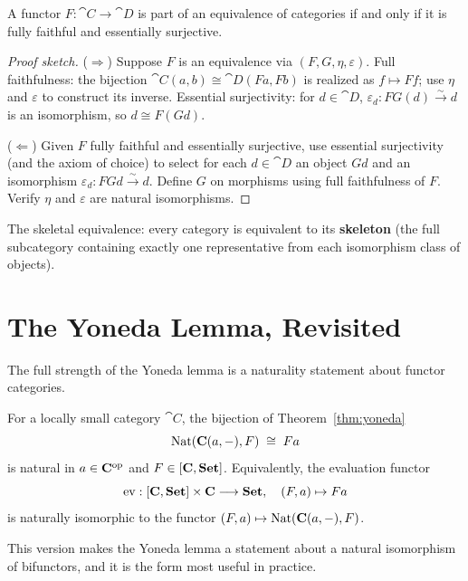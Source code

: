 \begin{theorem}
A functor $F: \cat{C} \to \cat{D}$ is part of an equivalence of categories if and only if it is fully faithful and essentially surjective.
\end{theorem}

\begin{proof}[Proof sketch]
($\Rightarrow$) Suppose $F$ is an equivalence via $(F, G, \eta, \varepsilon)$. Full faithfulness: the bijection $\cat{C}(a,b) \cong \cat{D}(Fa, Fb)$ is realized as $f \mapsto Ff$; use $\eta$ and $\varepsilon$ to construct its inverse. Essential surjectivity: for $d \in \cat{D}$, $\varepsilon_d: FG(d) \xrightarrow{\sim} d$ is an isomorphism, so $d \cong F(Gd)$.

($\Leftarrow$) Given $F$ fully faithful and essentially surjective, use essential surjectivity (and the axiom of choice) to select for each $d \in \cat{D}$ an object $Gd$ and an isomorphism $\varepsilon_d: FGd \xrightarrow{\sim} d$. Define $G$ on morphisms using full faithfulness of $F$. Verify $\eta$ and $\varepsilon$ are natural isomorphisms.
\end{proof}

\begin{example}
The skeletal equivalence: every category is equivalent to its \textbf{skeleton} (the full subcategory containing exactly one representative from each isomorphism class of objects).
\end{example}

\section{The Yoneda Lemma, Revisited}

The full strength of the Yoneda lemma is a naturality statement about functor categories.

\begin{theorem}
For a locally small category $\cat{C}$, the bijection of Theorem~\ref{thm:yoneda}
\[
  \operatorname{Nat}(\mathbf{C}(a,-), F) \;\cong\; Fa
\]
is natural in $a \in \mathbf{C}^{\mathrm{op}}$ and $F \in [\mathbf{C}, \mathbf{Set}]$. Equivalently, the evaluation functor
\[
  \mathrm{ev}: [\mathbf{C}, \mathbf{Set}] \times \mathbf{C} \longrightarrow \mathbf{Set}, \quad (F, a) \mapsto Fa
\]
is naturally isomorphic to the functor $(F, a) \mapsto \operatorname{Nat}(\mathbf{C}(a,-), F)$.
\end{theorem}

This version makes the Yoneda lemma a statement about a natural isomorphism of bifunctors, and it is the form most useful in practice.

